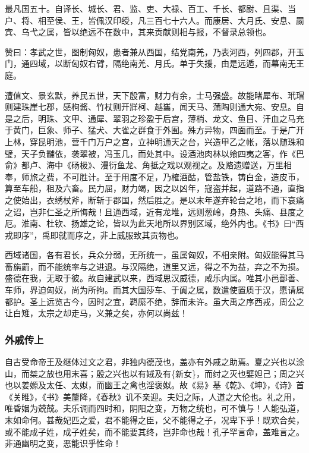 \documentclass[]{article}
\begin{document}
最凡国五十。自译长、城长、君、监、吏、大禄、百工、千长、都尉、且渠、当户、将、相至侯、王，皆佩汉印绶，凡三百七十六人。而康居、大月氏、安息、罽宾、乌弋之属，皆以绝远不在数中，其来贡献则相与报，不督录总领也。

赞曰：孝武之世，图制匈奴，患者兼从西国，结党南羌，乃表河西，列四郡，开玉门，通四域，以断匈奴右臂，隔绝南羌、月氏。单于失援，由是远遁，而幕南无王庭。

遭值文、景玄默，养民五世，天下殷富，财力有余，士马强盛。故能睹犀布、玳瑁则建珠崖七郡，感枸酱、竹杖则开牂柯、越巂，闻天马、蒲陶则通大宛、安息。自是之后，明珠、文甲、通犀、翠羽之珍盈于后宫，薄梢、龙文、鱼目、汗血之马充于黄门，巨象、师子、猛犬、大雀之群食于外囿。殊方异物，四面而至。于是广开上林，穿昆明池，营千门万户之宫，立神明通天之台，兴造甲乙之帐，落以随珠和璧，天子负黼依，袭翠被，冯玉几，而处其中。设酒池肉林以飨四夷之客，作《巴俞》都卢、海中《砀极》、漫衍鱼龙、角抵之戏以观视之。及赂遗赠送，万里相奉，师旅之费，不可胜计。至于用度不足，乃榷酒酤，管盐铁，铸白金，造皮币，算至车船，租及六畜。民力屈，财力竭，因之以凶年，寇盗并起，道路不通，直指之使始出，衣绣杖斧，断斩于郡国，然后胜之。是以末年遂弃轮台之地，而下哀痛之诏，岂非仁圣之所悔哉！且通西域，近有龙堆，远则葱岭，身热、头痛、县度之厄。淮南、杜钦、扬雄之论，皆以为此天地所以界别区域，绝外内也。《书》曰``西戎即序''，禹即就而序之，非上威服致其贡物也。

西域诸国，各有君长，兵众分弱，无所统一，虽属匈奴，不相亲附。匈奴能得其马畜旃罽，而不能统率与之进退。与汉隔绝，道里又远，得之不为益，弃之不为损。盛德在我，无取于彼。故自建武以来，西域思汉威德，咸乐内属。唯其小邑鄯善、车师，界迫匈奴，尚为所拘。而其大国莎车、于阗之属，数遣使置质于汉，愿请属都护。圣上远览古今，因时之宜，羁縻不绝，辞而未许。虽大禹之序西戎，周公之让白雉，太宗之却走马，义兼之矣，亦何以尚兹！

\hypertarget{header-n6490}{%
\subsubsection{外戚传上}\label{header-n6490}}

自古受命帝王及继体过文之君，非独内德茂也，盖亦有外戚之助焉。夏之兴也以涂山，而桀之放也用末喜；殷之兴也以有娀及有\{新女\}，而纣之灭也嬖妲己；周之兴也以姜嫄及太任、太姒，而幽王之禽也淫褒姒。故《易》基《乾》、《坤》，《诗》首《关睢》，《书》美釐降，《春秋》讥不亲迎。夫妇之际，人道之大伦也。礼之用，唯昏姻为兢兢。夫乐调而四时和，阴阳之变，万物之统也，可不慎与！人能弘道，末如命何。甚哉妃匹之爱，君不能得之臣，父不能得之子，况卑下乎！既欢合矣，或不能成子姓，成子姓矣，而不能要其终，岂非命也哉！孔子罕言命，盖难言之。非通幽明之变，恶能识乎性命！
\end{document}
